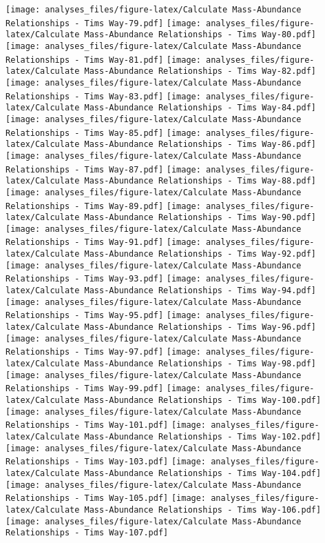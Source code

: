 \documentclass[]{article}
\begin{document}
\texttt{[image: analyses\_files/figure-latex/Calculate Mass-Abundance Relationships - Tims Way-79.pdf]}
\texttt{[image: analyses\_files/figure-latex/Calculate Mass-Abundance Relationships - Tims Way-80.pdf]}
\texttt{[image: analyses\_files/figure-latex/Calculate Mass-Abundance Relationships - Tims Way-81.pdf]}
\texttt{[image: analyses\_files/figure-latex/Calculate Mass-Abundance Relationships - Tims Way-82.pdf]}
\texttt{[image: analyses\_files/figure-latex/Calculate Mass-Abundance Relationships - Tims Way-83.pdf]}
\texttt{[image: analyses\_files/figure-latex/Calculate Mass-Abundance Relationships - Tims Way-84.pdf]}
\texttt{[image: analyses\_files/figure-latex/Calculate Mass-Abundance Relationships - Tims Way-85.pdf]}
\texttt{[image: analyses\_files/figure-latex/Calculate Mass-Abundance Relationships - Tims Way-86.pdf]}
\texttt{[image: analyses\_files/figure-latex/Calculate Mass-Abundance Relationships - Tims Way-87.pdf]}
\texttt{[image: analyses\_files/figure-latex/Calculate Mass-Abundance Relationships - Tims Way-88.pdf]}
\texttt{[image: analyses\_files/figure-latex/Calculate Mass-Abundance Relationships - Tims Way-89.pdf]}
\texttt{[image: analyses\_files/figure-latex/Calculate Mass-Abundance Relationships - Tims Way-90.pdf]}
\texttt{[image: analyses\_files/figure-latex/Calculate Mass-Abundance Relationships - Tims Way-91.pdf]}
\texttt{[image: analyses\_files/figure-latex/Calculate Mass-Abundance Relationships - Tims Way-92.pdf]}
\texttt{[image: analyses\_files/figure-latex/Calculate Mass-Abundance Relationships - Tims Way-93.pdf]}
\texttt{[image: analyses\_files/figure-latex/Calculate Mass-Abundance Relationships - Tims Way-94.pdf]}
\texttt{[image: analyses\_files/figure-latex/Calculate Mass-Abundance Relationships - Tims Way-95.pdf]}
\texttt{[image: analyses\_files/figure-latex/Calculate Mass-Abundance Relationships - Tims Way-96.pdf]}
\texttt{[image: analyses\_files/figure-latex/Calculate Mass-Abundance Relationships - Tims Way-97.pdf]}
\texttt{[image: analyses\_files/figure-latex/Calculate Mass-Abundance Relationships - Tims Way-98.pdf]}
\texttt{[image: analyses\_files/figure-latex/Calculate Mass-Abundance Relationships - Tims Way-99.pdf]}
\texttt{[image: analyses\_files/figure-latex/Calculate Mass-Abundance Relationships - Tims Way-100.pdf]}
\texttt{[image: analyses\_files/figure-latex/Calculate Mass-Abundance Relationships - Tims Way-101.pdf]}
\texttt{[image: analyses\_files/figure-latex/Calculate Mass-Abundance Relationships - Tims Way-102.pdf]}
\texttt{[image: analyses\_files/figure-latex/Calculate Mass-Abundance Relationships - Tims Way-103.pdf]}
\texttt{[image: analyses\_files/figure-latex/Calculate Mass-Abundance Relationships - Tims Way-104.pdf]}
\texttt{[image: analyses\_files/figure-latex/Calculate Mass-Abundance Relationships - Tims Way-105.pdf]}
\texttt{[image: analyses\_files/figure-latex/Calculate Mass-Abundance Relationships - Tims Way-106.pdf]}
\texttt{[image: analyses\_files/figure-latex/Calculate Mass-Abundance Relationships - Tims Way-107.pdf]}
\end{document}
